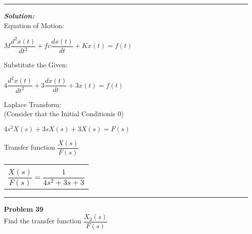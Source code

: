 \documentclass[11pt,letterpaper]{article}
\begin{document}
	
	\rule{\textwidth}{1pt}
\vspace{12pt}
\textit{\textbf{Solution:}}\\
Equation of Motion:\\
\begin{center}
	$M\dfrac{d^2x(t)}{dt^2}+fv\dfrac{dx(t)}{dt}+Kx(t)=f(t)$\\[12pt]
\end{center}
Substitute the Given:\\
\begin{center}
	$4\dfrac{d^2x(t)}{dt^2}+3\dfrac{dx(t)}{dt}+3x(t)=f(t)$\\[12pt]
\end{center}
Laplace Transform:\\[12pt]
(Consider that the Initial Conditionis 0)\\
\begin{center}
	$4s^2X(s)+3sX(s)+3X(s)=F(s)$\\[12pt]
\end{center}
Transfer function $\dfrac{X(s)}{F(s)}$\\
\begin{center}
	\begin{tabular}{|c|}
		\hline \\
		$\dfrac{X(s)}{F(s)}=\dfrac{1}{4s^2+3s+3}$	\\ [12pt]
	\hline
	\end{tabular}	
\end{center}

\clearpage
\rule{\textwidth}{1pt}
\textbf{Problem 39}\\
Find the transfer function $\dfrac{X_2(s)}{F(s)}$\\
\end{document}
